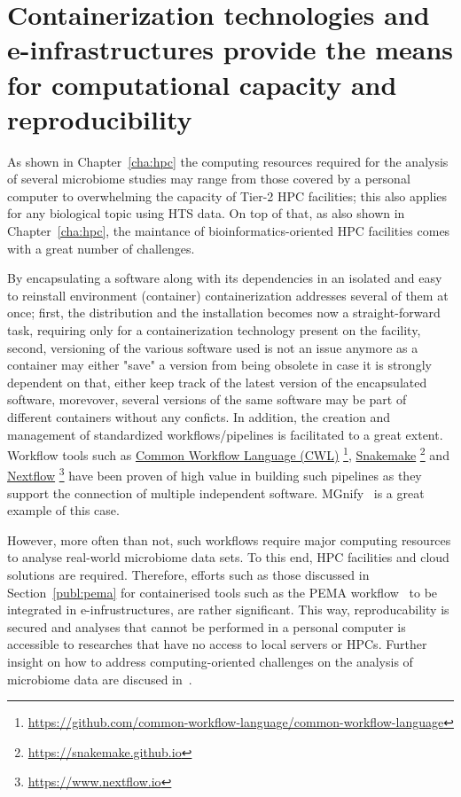 \section{Containerization technologies and e-infrastructures provide the means for computational capacity and reproducibility} 
\label{concl:comput}
   
      As shown in Chapter~\ref{cha:hpc} the computing resources required for the analysis of several 
      microbiome studies may range from those covered by a personal computer to overwhelming the capacity
      of Tier-2 HPC facilities;
      this also applies for any biological topic using HTS data. 
      On top of that, as also shown in Chapter~\ref{cha:hpc}, the maintance of bioinformatics-oriented HPC facilities 
      comes with a great number of challenges. 
   
      By encapsulating a software along with its dependencies in an isolated and easy to reinstall environment (container) 
      containerization addresses several of them at once; 
      first, the distribution and the installation becomes now a straight-forward task, requiring only for a containerization technology 
      present on the facility,
      second, versioning of the various software used is not an issue anymore as a container may either "save" a version from being obsolete
      in case it is strongly dependent on that, either keep track of the latest version of the encapsulated software, 
      morevover, several versions of the same software may be part of different containers without any conficts.
      In addition, the creation and management of standardized workflows/pipelines is facilitated to a great extent. 
      Workflow tools such as 
      \href{https://github.com/common-workflow-language/common-workflow-language}{Common Workflow Language (CWL)}
      \footnote{\href{https://github.com/common-workflow-language/common-workflow-language}{https://github.com/common-workflow-language/common-workflow-language}}, 
      \href{https://snakemake.github.io}{Snakemake} 
      \footnote{\href{https://snakemake.github.io}{https://snakemake.github.io}}
      and 
      \href{https://www.nextflow.io}{Nextflow}
      \footnote{\href{https://www.nextflow.io}{https://www.nextflow.io}}
      have been proven of high value 
      in building such pipelines as they support the connection of multiple independent software.
      MGnify~\citep{mitchell2020mgnify} is a great example of this case. 
   
      However, more often than not, such workflows require major computing resources to analyse
      real-world microbiome data sets.
      To this end, HPC facilities and cloud solutions are required. 
      Therefore, efforts such as those discussed in Section~\ref{publ:pema} 
      for containerised tools such as the PEMA workflow~\citep{zafeiropoulos2020pema}
      to be integrated in e-infrustructures, are rather significant. 
      This way, reproducability is secured and analyses that cannot be performed in a personal computer
      is accessible to researches that have no access to local servers or HPCs. 
      Further insight on how to address computing-oriented challenges on the analysis of microbiome data
      are discused in~\citep{hu2022challenges}.  

